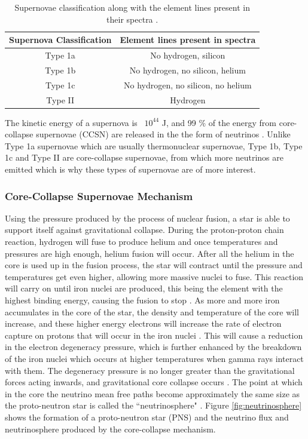 \begin{table}
\centering
\begin{tabular}{||c c||} 
    \hline
    Supernova Classification & Element lines present in spectra \\ 
    \hline 
    Type 1a & No hydrogen, silicon  \\ 
    \hline
    Type 1b & No hydrogen, no silicon, helium  \\
    \hline
    Type 1c & No hydrogen, no silicon, no helium  \\
    \hline
    Type II & Hydrogen  \\
    \hline 
\end{tabular}
\caption{Supernovae classification along with the element lines present in their spectra \cite{Gal_Yam_2017}.}
\label{table:supernova_classification}
\end{table}

The kinetic energy of a supernova is ~$10^{44}$ J, and 99 \% of the energy from core-collapse supernovae (CCSN) are released in the the form of neutrinos \cite{scholberg2012supernova}. Unlike Type 1a supernovae which are usually thermonuclear supernovae, Type 1b, Type 1c and Type II are core-collapse supernovae, from which more neutrinos are emitted which is why these types of supernovae are of more interest. 

\subsubsection{Core-Collapse Supernovae Mechanism}

Using the pressure produced by the process of nuclear fusion, a star is able to support itself against gravitational collapse. During the proton-proton chain reaction, hydrogen will fuse to produce helium and once temperatures and pressures are high enough, helium fusion will occur. After all the helium in the core is used up in the fusion process, the star will contract until the pressure and temperatures get even higher, allowing more massive nuclei to fuse. This reaction will carry on until iron nuclei are produced, this being the element with the highest binding energy, causing the fusion to stop \cite{couch2017mechanism}.
\newline
As more and more iron accumulates in the core of the star, the density and temperature of the core will increase, and these higher energy electrons will increase the rate of electron capture on protons that will occur in the iron nuclei \cite{fryer2019gamma}. This will cause a reduction in the electron degeneracy pressure, which is further enhanced by the breakdown of the iron nuclei which occurs at higher temperatures when gamma rays interact with them. The degeneracy pressure is no longer greater than the gravitational forces acting inwards, and gravitational core collapse occurs \cite{ebinger2017global}. 
\newline
The point at which in the core the neutrino mean free paths become approximately the same size as the proto-neutron star is called the ``neutrinosphere" \cite{PhysRevD.101.023018}.  Figure \ref{fig:neutrinosphere} shows the formation of a proto-neutron star (PNS) and the neutrino flux and neutrinosphere produced by the core-collapse mechanism. 

